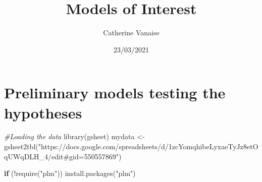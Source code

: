 \documentclass[
]{article}
\title{Models of Interest}
\author{Catherine Vanaise}
\date{23/03/2021}
\newenvironment{Shaded}{\begin{snugshade}}{\end{snugshade}}
\newcommand{\CommentTok}[1]{\textcolor[rgb]{0.56,0.35,0.01}{\textit{#1}}}
\newcommand{\ControlFlowTok}[1]{\textcolor[rgb]{0.13,0.29,0.53}{\textbf{#1}}}
\newcommand{\DecValTok}[1]{\textcolor[rgb]{0.00,0.00,0.81}{#1}}
\newcommand{\FunctionTok}[1]{\textcolor[rgb]{0.00,0.00,0.00}{#1}}
\newcommand{\NormalTok}[1]{#1}
\newcommand{\OtherTok}[1]{\textcolor[rgb]{0.56,0.35,0.01}{#1}}
\newcommand{\SpecialCharTok}[1]{\textcolor[rgb]{0.00,0.00,0.00}{#1}}
\newcommand{\StringTok}[1]{\textcolor[rgb]{0.31,0.60,0.02}{#1}}
\begin{document}
\maketitle

\hypertarget{preliminary-models-testing-the-hypotheses}{%
\section{Preliminary models testing the
hypotheses}\label{preliminary-models-testing-the-hypotheses}}

\begin{Shaded}
\begin{Highlighting}[]
\CommentTok{\#Loading the data}
\FunctionTok{library}\NormalTok{(gsheet)}
\NormalTok{mydata }\OtherTok{\textless{}{-}} \FunctionTok{gsheet2tbl}\NormalTok{(}\StringTok{"https://docs.google.com/spreadsheets/d/1zcYomqhibeLyxaeTyJz8etOqUWqDLH\_4/edit\#gid=550557869"}\NormalTok{)}
\end{Highlighting}
\end{Shaded}

\begin{Shaded}
\end{Shaded}

\begin{Shaded}
\begin{Highlighting}[]
\ControlFlowTok{if}\NormalTok{ (}\SpecialCharTok{!}\FunctionTok{require}\NormalTok{(}\StringTok{"plm"}\NormalTok{)) }\FunctionTok{install.packages}\NormalTok{(}\StringTok{"plm"}\NormalTok{)}
\end{Highlighting}
\end{Shaded}
\end{document}
